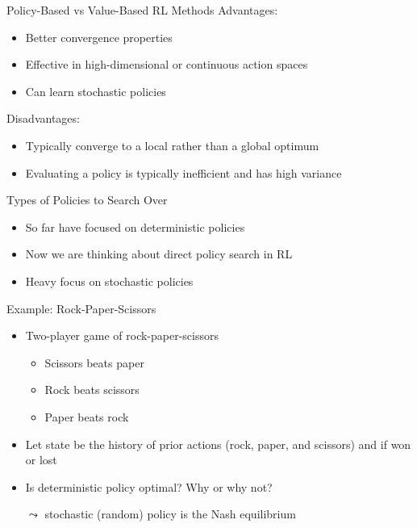 \documentclass[aspectratio=169]{../latex_main/tntbeamer}  %
\begin{document}
\begin{frame}[c]{Policy-Based vs Value-Based RL Methods}
Advantages:
\begin{itemize}
    \item Better convergence properties
    \item Effective in high-dimensional or continuous action spaces
    \item Can learn stochastic policies
\end{itemize}

\pause
\bigskip
Disadvantages:
\begin{itemize}
    \item Typically converge to a local rather than a global optimum
    \item Evaluating a policy is typically inefficient and has high variance
\end{itemize}

\end{frame}
\begin{frame}[c]{Types of Policies to Search Over}
	
\begin{itemize}
	\item So far have focused on deterministic policies
	\item Now we are thinking about direct policy search in RL
    \item Heavy focus on stochastic policies
\end{itemize}

\end{frame}
\begin{frame}[c]{Example: Rock-Paper-Scissors}
	
	\begin{itemize}
		\item Two-player game of rock-paper-scissors
		\begin{itemize}
			\item Scissors beats paper
			\item Rock beats scissors
			\item Paper beats rock
		\end{itemize}
		\item Let state be the history of prior actions (rock, paper, and scissors) and if
		won or lost
		\item Is deterministic policy optimal? Why or why not?
		\pause
		\item[$\leadsto$] stochastic (random) policy is the Nash equilibrium
	\end{itemize}

	
\end{frame}
\end{document}
